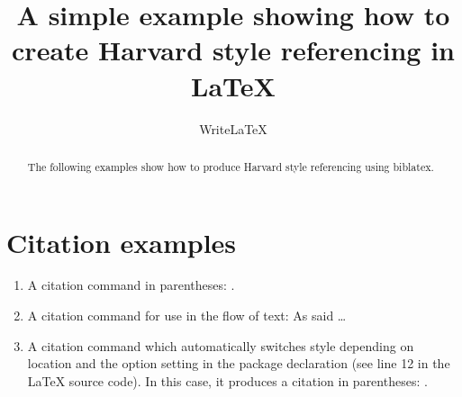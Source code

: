 \documentclass[a4paper]{article}
\title{A simple example showing how to create Harvard style referencing in LaTeX}
\author{WriteLaTeX}
\date{}
\begin{document}
\maketitle

\begin{abstract}
The following examples show how to produce Harvard style referencing using biblatex.
\end{abstract}

\section*{Citation examples}

\begin{enumerate}
\item A citation command in parentheses: \parencite{Smith:2012qr}.
\item A citation command for use in the flow of text: As \textcite{Smith:2013jd} said \dots
\item A citation command which \parencite{dirac} automatically switches style depending on location and the option setting in the package declaration (see line 12 in the LaTeX source code). In this case, it produces a citation in parentheses: \autocite{Other:2014ab}.
\end{enumerate}

\printbibliography
\end{document}
